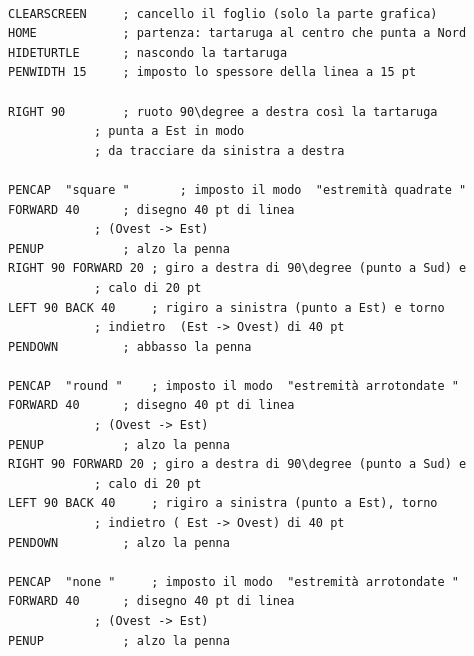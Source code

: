 \lstset{extendedchars=true, basicstyle=\scriptsize} 
\begin{lstlisting}[frame=single]  % Start your code-block

CLEARSCREEN		; cancello il foglio (solo la parte grafica)
HOME			; partenza: tartaruga al centro che punta a Nord 
HIDETURTLE		; nascondo la tartaruga
PENWIDTH 15		; imposto lo spessore della linea a 15 pt

RIGHT 90		; ruoto 90\degree a destra così la tartaruga 
			; punta a Est in modo 
			; da tracciare da sinistra a destra
				
PENCAP  "square "		; imposto il modo  "estremità quadrate "
FORWARD 40		; disegno 40 pt di linea 
			; (Ovest -> Est)
PENUP  			; alzo la penna
RIGHT 90 FORWARD 20	; giro a destra di 90\degree (punto a Sud) e 
			; calo di 20 pt
LEFT 90 BACK 40		; rigiro a sinistra (punto a Est) e torno 
			; indietro  (Est -> Ovest) di 40 pt
PENDOWN			; abbasso la penna

PENCAP  "round "	; imposto il modo  "estremità arrotondate "
FORWARD 40		; disegno 40 pt di linea 
			; (Ovest -> Est)
PENUP			; alzo la penna
RIGHT 90 FORWARD 20	; giro a destra di 90\degree (punto a Sud) e 
			; calo di 20 pt
LEFT 90 BACK 40		; rigiro a sinistra (punto a Est), torno 
			; indietro ( Est -> Ovest) di 40 pt 
PENDOWN			; alzo la penna

PENCAP  "none "		; imposto il modo  "estremità arrotondate "
FORWARD 40		; disegno 40 pt di linea 
			; (Ovest -> Est)
PENUP			; alzo la penna

\end{lstlisting}

\vskip 1cm

